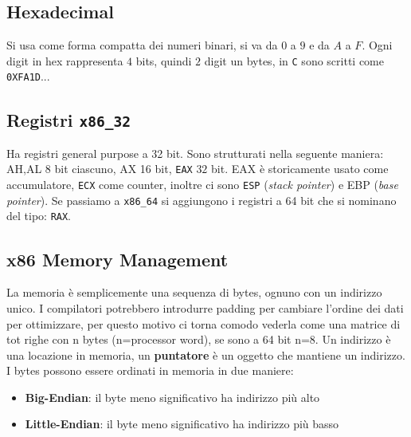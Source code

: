\documentclass[oneside,a4paper,11pt]{book}
\theoremstyle{italicstyle}
\theoremstyle{normStyle}
\begin{document}
\subsection{Hexadecimal}
Si usa come forma compatta dei numeri binari, si va da $0$ a $9$ e da $A$ a $F$.
Ogni digit in hex rappresenta $4$ bits, quindi $2$ digit un bytes,
in \texttt{C} sono scritti come \texttt{0XFA1D}...

\subsection{Registri \texttt{x86\_32}}
Ha registri general purpose a 32 bit. Sono strutturati
nella seguente maniera: AH,AL 8 bit ciascuno, AX 16 bit,
\texttt{EAX} $32$ bit. EAX è storicamente usato come accumulatore,
\texttt{ECX} come counter, inoltre ci sono \texttt{ESP} (\textit{stack pointer}) e
EBP (\textit{base pointer}). Se passiamo a \texttt{x86\_64} 
si aggiungono i
registri a 64 bit che si nominano del tipo: \texttt{RAX}.

\subsection{x86 Memory Management}
La memoria è semplicemente una sequenza di bytes,
ognuno con un indirizzo unico. I compilatori potrebbero
introdurre padding per cambiare l'ordine dei dati per ottimizzare,
per questo motivo ci torna comodo vederla come una matrice di tot
righe con n bytes (n=processor word), se sono a 64 bit n=8. Un
indirizzo è una locazione in memoria, un \textbf{puntatore} è un
oggetto che mantiene un indirizzo. I bytes possono essere ordinati
in memoria in due maniere:
\begin{itemize}
\item \textbf{Big-Endian}: il byte meno significativo ha indirizzo più alto
\item \textbf{Little-Endian}: il byte meno significativo ha indirizzo più basso
\end{itemize}
\end{document}
